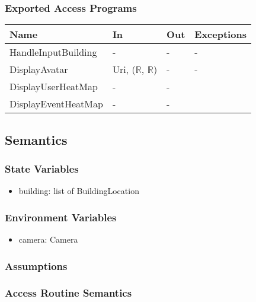 \documentclass[12pt, titlepage]{article}
\begin{document}
\subsubsection{Exported Access Programs}

\begin{center}
\begin{tabular}{p{4cm} p{3cm} p{3cm} p{4cm}}
\hline
\textbf{Name} & \textbf{In} & \textbf{Out} & \textbf{Exceptions} \\
\hline
HandleInputBuilding & - & - & - \\
DisplayAvatar & Uri, ($\mathbb{R}$, $\mathbb{R}$) & - & -\\
DisplayUserHeatMap & - & -\\
DisplayEventHeatMap & - & -\\

\hline
\end{tabular}
\end{center}

\subsection{Semantics}

\subsubsection{State Variables}

\begin{itemize}
\item building: list of BuildingLocation
\end{itemize}

\subsubsection{Environment Variables}
\begin{itemize}
\item camera: Camera
\end{itemize}
  

\subsubsection{Assumptions}

\subsubsection{Access Routine Semantics}
\end{document}
